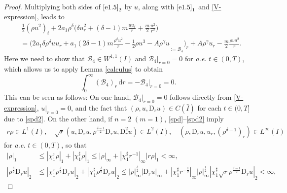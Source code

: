 \documentclass[11pt,reqno]{amsart}
\numberwithin{rk}{section}
\numberwithin{prop}{section}
\numberwithin{mydef}{section}
\numberwithin{lem}{section}
\numberwithin{equation}{section}
\numberwithin{thm}{section}
\begin{document}
\begin{proof}
Multiplying both sides of $\eqref{e1.5}_2$ by $u$, along with $\eqref{e1.5}_1$ and \eqref{V-expression}, leads to
\begin{equation}\label{5-1}
\begin{aligned}
&\,\frac{1}{2}(\rho u^2)_t + 2a_1 \rho^\delta \Big(\delta u_r^2+ (\delta-1) m\frac{u u_r}{r}+  \frac{m}{2} \frac{u^2}{r^2}\Big)\\
&=\Big(\underline{2a_1\delta\rho^\delta uu_r+ a_1 (2\delta-1) m \frac{\rho^\delta u^2}{r}-\frac{1}{2}\rho u^3-A\rho^\gamma u}_{:=\mathcal{B}_4}\Big)_r+A\rho^\gamma u_r -\frac{m}{2}\frac{\rho vu^2}{r}.
\end{aligned}
\end{equation}
Here we need to show  that $\mathcal{B}_4\in W^{1,1}(I)$ and $\mathcal{B}_4|_{r=0}=0$ for {\it a.e.} $t\in (0,T)$, which allows us to apply Lemma \ref{calculus} to obtain
\begin{equation}\label{eq:B4}
\int_0^\infty (\mathcal{B}_4)_r\,\mathrm{d}r=-\mathcal{B}_4|_{r=0}=0.
\end{equation}
This can be seen as follows: 
On one hand, $\mathcal{B}_4|_{r=0}=0$ follows directly 
from \eqref{V-expression}, $u|_{r=0}=0$, 
and the fact that $(\rho,u,\mathrm{D}_r u)\in C(\bar I)$ for each $t\in (0,T]$ due to \eqref{spd2}. 
On the other hand,  if $n=2$ $(m=1)$, \eqref{spd}--\eqref{spd2} 
imply  
\begin{equation*}
\begin{aligned}
r\rho\in L^1(I),\quad \sqrt{r} (u,\mathrm{D}_r u,\rho^\frac{\delta-1}{2}\mathrm{D}_r u,\mathrm{D}_r^2 u)\in L^2(I),\quad (\rho,\mathrm{D}_r u,u_r,(\rho^{\delta-1})_r)\in L^\infty(I) 
\end{aligned}
\end{equation*}
for {\it a.e.} $t\in (0,T)$, so that 
\begin{equation*}
\begin{aligned}
|\rho|_1&\leq |\chi_1^\flat\rho|_1+|\chi_1^\sharp\rho|_1\leq |\rho|_\infty+|\chi_1^\sharp r^{-1}|_\infty|r\rho|_1<\infty, \\
|\rho^\frac{\delta}{2}\mathrm{D}_r u|_2&\leq |\chi_1^\flat\rho^\frac{\delta}{2}\mathrm{D}_r u|_2+ |\chi_1^\sharp\rho^\frac{\delta}{2}\mathrm{D}_r u|_2 \leq |\rho|_\infty^\frac{\delta}{2} |\mathrm{D}_r u|_\infty+|\chi_1^\sharp r^{-\frac{1}{2}}|_\infty|\rho|_\infty^\frac{1}{2} |\chi_1^\sharp \sqrt{r}\rho^\frac{\delta-1}{2}\mathrm{D}_r u|_2<\infty,
\end{aligned}
\end{equation*}

\end{proof}
\end{document}
